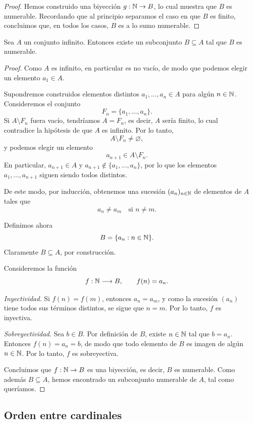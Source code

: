 \begin{proof}
\medskip

Hemos construido una biyección $g : \mathbb{N} \to B$, lo cual muestra que $B$ es
numerable. Recordando que al principio separamos el caso en que $B$ es
finito, concluimos que, en todos los casos, $B$ es a lo sumo numerable.
\end{proof}

\begin{teo}
Sea $A$ un conjunto infinito. Entonces existe un subconjunto
$B \subseteq A$ tal que $B$ es numerable.
\end{teo}

\begin{proof}
Como $A$ es infinito, en particular es no vacío, de modo que podemos elegir
un elemento $a_1 \in A$.

Supondremos construidos elementos distintos $a_1,\dots,a_n \in A$ para algún
$n \in \mathbb{N}$. Consideremos el conjunto
\[
F_n = \{a_1,\dots,a_n\}.
\]
Si $A \setminus F_n$ fuera vacío, tendríamos $A = F_n$, es decir, $A$
sería finito, lo cual contradice la hipótesis de que $A$ es infinito.
Por lo tanto,
\[
A \setminus F_n \neq \varnothing,
\]
y podemos elegir un elemento
\[
a_{n+1} \in A \setminus F_n.
\]
En particular, $a_{n+1} \in A$ y $a_{n+1} \notin \{a_1,\dots,a_n\}$, por
lo que los elementos $a_1,\dots,a_{n+1}$ siguen siendo todos distintos.

De este modo, por inducción, obtenemos una sucesión $(a_n)_{n\in\mathbb{N}}$ de
elementos de $A$ tales que
\[
a_n \neq a_m \quad \text{si } n \neq m.
\]

Definimos ahora
\[
B = \{a_n : n \in \mathbb{N}\}.
\]
Claramente $B \subseteq A$, por construcción.

Consideremos la función
\[
f : \mathbb{N} \longrightarrow B, \qquad f(n) = a_n.
\]

\emph{Inyectividad.}  
Si $f(n) = f(m)$, entonces $a_n = a_m$, y como la sucesión $(a_n)$ tiene
todos sus términos distintos, se sigue que $n = m$. Por lo tanto, $f$ es
inyectiva.

\emph{Sobreyectividad.}  
Sea $b \in B$. Por definición de $B$, existe $n \in \mathbb{N}$ tal que $b = a_n$.
Entonces $f(n) = a_n = b$, de modo que todo elemento de $B$ es imagen de
algún $n \in \mathbb{N}$. Por lo tanto, $f$ es sobreyectiva.

Concluimos que $f : \mathbb{N} \to B$ es una biyección, es decir, $B$ es numerable.
Como además $B \subseteq A$, hemos encontrado un subconjunto numerable de
$A$, tal como queríamos.
\end{proof}

\subsection{Orden entre cardinales}

